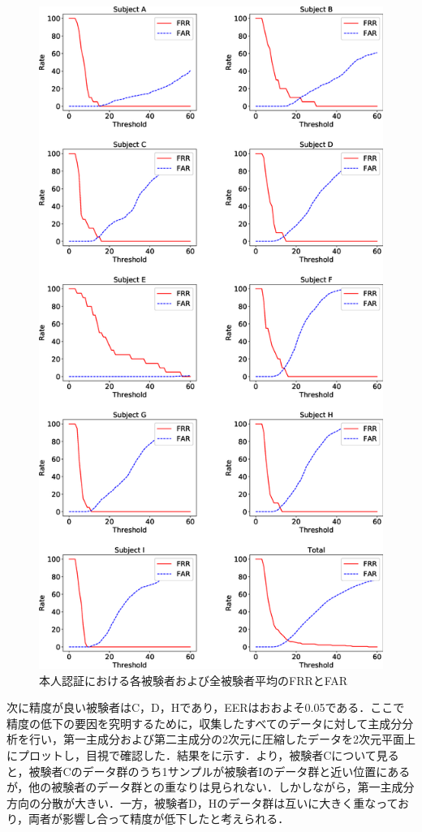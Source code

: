 \documentclass[Japanese,noauthor]{dicomopapers}
\begin{document}
\begin{figure}[!t]
  \centering
    \includegraphics[width=1\linewidth]{figure/EER.eps}
  \caption{本人認証における各被験者および全被験者平均のFRRとFAR}
  \label{EER}
\end{figure}

次に精度が良い被験者はC，D，Hであり，EERはおおよそ0.05である．ここで精度の低下の要因を究明するために，収集したすべてのデータに対して主成分分析を行い，第一主成分および第二主成分の2次元に圧縮したデータを2次元平面上にプロットし，目視で確認した．結果をに示す．より，被験者Cについて見ると，被験者Cのデータ群のうち1サンプルが被験者Iのデータ群と近い位置にあるが，他の被験者のデータ群との重なりは見られない．しかしながら，第一主成分方向の分散が大きい．一方，被験者D，Hのデータ群は互いに大きく重なっており，両者が影響し合って精度が低下したと考えられる．\par
\end{document}
